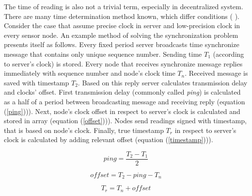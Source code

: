The time of reading is also not a trivial term, especially in decentralized system. There are many time determination method known, which differ conditions (\cite{time_sync} \cite{time_sync2}). Consider the case that assume precise clock in server and low-precision clock in every sensor node. An example method of solving the synchronization problem presents itself as follows. Every fixed period server broadcasts time synchronize message that contains only unique sequence number. Sending time $T_1$ (according to server's clock) is stored. Every node that receives synchronize message replies immediately with sequence number and node's clock time $T_n$. Received message is saved with timestamp $T_2$. Based on this reply server calculates transmission delay and clocks' offset. First transmission delay (commonly called \textit{ping}) is calculated as a half of a period between broadcasting message and receiving reply (equation (\ref{ping}))). Next, node's clock offset in respect to server's clock is calculated and stored in array (equation (\ref{offset}))). Nodes send readings signed with timestamp, that is based on node's clock. Finally, true timestamp $T_r$ in respect to server's clock is calculated by adding relevant offset (equation (\ref{timestamp}))).

\begin{equation}
	ping = \frac{T_2 - T_1}{2}
	\label{ping}
\end{equation}

\begin{equation}
	offset = T_2 - ping - T_n
	\label{offset}
\end{equation}

\begin{equation}
	T_r = T_n + offset
	\label{timestamp}
\end{equation}